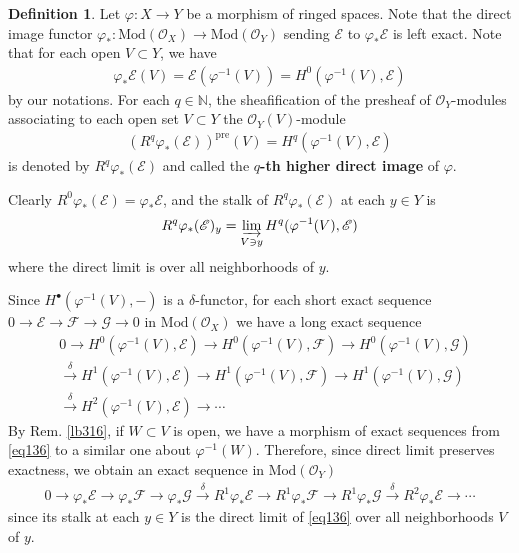 \documentclass[12pt,b5paper,notitlepage]{report}
\theoremstyle{definition}
\newtheorem{df}{Definition}[section]
\theoremstyle{plain}
\newcommand{\scr}{\mathscr}
\newcommand{\blt}{\bullet}
\newcommand{\Nbb}{\mathbb N}
\newcommand{\pre}{\mathrm{pre}}
\newcommand{\Mod}{\mathrm{Mod}}
\numberwithin{equation}{section}
\begin{document}
\begin{df}
Let $\varphi:X\rightarrow Y$ be a morphism of ringed spaces. Note that the direct image functor $\varphi_*:\Mod(\scr O_X)\rightarrow\Mod(\scr O_Y)$ sending $\scr E$ to $\varphi_*\scr E$ is left exact. Note that for each open $V\subset Y$, we have
\begin{align*}
\varphi_*\scr E(V)=\scr E(\varphi^{-1}(V))=H^0(\varphi^{-1}(V),\scr E)
\end{align*}
by our notations. For each $q\in\Nbb$, the sheafification of the presheaf of $\scr O_Y$-modules associating to each open set $V\subset Y$ the $\scr O_Y(V)$-module
\begin{align*}
(R^q\varphi_*(\scr E))^\pre(V)=H^q(\varphi^{-1}(V),\scr E)
\end{align*}
is denoted by $R^q\varphi_*(\scr E)$ and called the \textbf{$q$-th higher direct image} \index{Rq@$R^q\varphi_*\scr E$, higher direct image} of $\varphi$. 

Clearly $R^0\varphi_*(\scr E)=\varphi_*\scr E$, and the stalk of $R^q\varphi_*(\scr E)$ at each $y\in Y$ is
\begin{align}
R^q\varphi_*(\scr E)_y=\varinjlim_{V\ni y}H^q(\varphi^{-1}(V),\scr E)
\end{align}
where the direct limit is over all neighborhoods of $y$.  \hfill\qedsymbol
\end{df}





Since $H^\blt(\varphi^{-1}(V),-)$ is a $\delta$-functor, for each short exact sequence $0\rightarrow\scr E\rightarrow\scr F\rightarrow\scr G\rightarrow 0$ in $\Mod(\scr O_X)$ we have a long exact sequence
\begin{align}
&0\rightarrow H^0(\varphi^{-1}(V),\scr E)\rightarrow H^0(\varphi^{-1}(V),\scr F)\rightarrow H^0(\varphi^{-1}(V),\scr G) \nonumber\\
&\xrightarrow{\delta} H^1(\varphi^{-1}(V),\scr E)\rightarrow H^1(\varphi^{-1}(V),\scr F)\rightarrow H^1(\varphi^{-1}(V),\scr G)\nonumber\\
&\xrightarrow{\delta} H^2(\varphi^{-1}(V),\scr E)\rightarrow\cdots   \label{eq136}
\end{align}
By Rem. \ref{lb316}, if $W\subset V$ is open, we have a morphism of exact sequences from \eqref{eq136} to a similar one about $\varphi^{-1}(W)$. Therefore, since direct limit preserves exactness, we obtain an exact sequence in $\Mod(\scr O_Y)$
\begin{align}
0\rightarrow \varphi_*\scr E\rightarrow \varphi_*\scr F\rightarrow\varphi_*\scr G\xrightarrow{\delta} R^1\varphi_*\scr E\rightarrow R^1\varphi_*\scr F\rightarrow R^1\varphi_*\scr G\xrightarrow{\delta} R^2\varphi_*\scr E\rightarrow\cdots
\end{align}
since its stalk at each $y\in Y$ is the direct limit of \eqref{eq136} over all neighborhoods $V$ of $y$.
\end{document}
